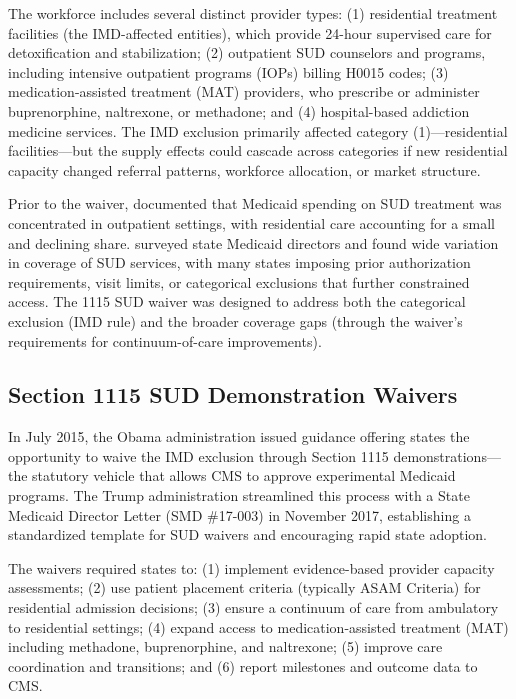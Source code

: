 \documentclass[12pt]{article}
\begin{document}
The workforce includes several distinct provider types: (1) residential treatment facilities (the IMD-affected entities), which provide 24-hour supervised care for detoxification and stabilization; (2) outpatient SUD counselors and programs, including intensive outpatient programs (IOPs) billing H0015 codes; (3) medication-assisted treatment (MAT) providers, who prescribe or administer buprenorphine, naltrexone, or methadone; and (4) hospital-based addiction medicine services. The IMD exclusion primarily affected category (1)---residential facilities---but the supply effects could cascade across categories if new residential capacity changed referral patterns, workforce allocation, or market structure.

Prior to the waiver, \citet{mark2015funding} documented that Medicaid spending on SUD treatment was concentrated in outpatient settings, with residential care accounting for a small and declining share. \citet{grogan2016survey} surveyed state Medicaid directors and found wide variation in coverage of SUD services, with many states imposing prior authorization requirements, visit limits, or categorical exclusions that further constrained access. The 1115 SUD waiver was designed to address both the categorical exclusion (IMD rule) and the broader coverage gaps (through the waiver's requirements for continuum-of-care improvements).

\subsection{Section 1115 SUD Demonstration Waivers}

In July 2015, the Obama administration issued guidance offering states the opportunity to waive the IMD exclusion through Section 1115 demonstrations---the statutory vehicle that allows CMS to approve experimental Medicaid programs. The Trump administration streamlined this process with a State Medicaid Director Letter (SMD \#17-003) in November 2017, establishing a standardized template for SUD waivers and encouraging rapid state adoption.

The waivers required states to: (1) implement evidence-based provider capacity assessments; (2) use patient placement criteria (typically ASAM Criteria) for residential admission decisions; (3) ensure a continuum of care from ambulatory to residential settings; (4) expand access to medication-assisted treatment (MAT) including methadone, buprenorphine, and naltrexone; (5) improve care coordination and transitions; and (6) report milestones and outcome data to CMS.
\end{document}
